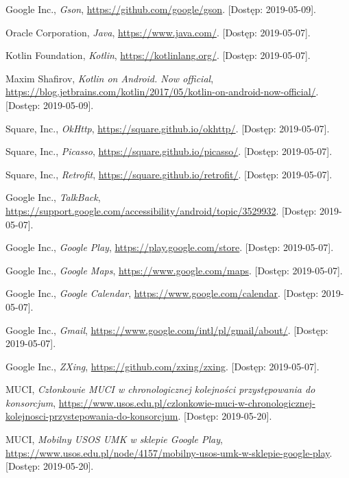 \documentclass{pracamgr}
\begin{document}
\begin{thebibliography}{99}
 Google Inc., \textit{Gson},	\url{https://github.com/google/gson}. [Dostęp: 2019-05-09].

 Oracle Corporation, \textit{Java}, \url{https://www.java.com/}. [Dostęp: 2019-05-07].

 Kotlin Foundation, \textit{Kotlin}, \url{https://kotlinlang.org/}. [Dostęp: 2019-05-07].

 Maxim Shafirov, \textit{Kotlin on Android. Now official},
	\url{https://blog.jetbrains.com/kotlin/2017/05/kotlin-on-android-now-official/}. [Dostęp: 2019-05-09].

 Square, Inc., \textit{OkHttp},	\url{https://square.github.io/okhttp/}. [Dostęp: 2019-05-07].

 Square, Inc., \textit{Picasso}, \url{https://square.github.io/picasso/}. [Dostęp: 2019-05-07].

 Square, Inc., \textit{Retrofit}, \url{https://square.github.io/retrofit/}. [Dostęp: 2019-05-07].

 Google Inc., \textit{TalkBack}, \url{https://support.google.com/accessibility/android/topic/3529932}. [Dostęp: 2019-05-07].

 Google Inc., \textit{Google Play}, \url{https://play.google.com/store}. [Dostęp: 2019-05-07].

 Google Inc., \textit{Google Maps},	\url{https://www.google.com/maps}. [Dostęp: 2019-05-07].

 Google Inc., \textit{Google Calendar},	\url{https://www.google.com/calendar}. [Dostęp: 2019-05-07].

 Google Inc., \textit{Gmail}, \url{https://www.google.com/intl/pl/gmail/about/}. [Dostęp: 2019-05-07].

 Google Inc., \textit{ZXing}, \url{https://github.com/zxing/zxing}. [Dostęp: 2019-05-07].

 MUCI, \textit{Członkowie MUCI w chronologicznej kolejności przystępowania do konsorcjum}, \url{https://www.usos.edu.pl/czlonkowie-muci-w-chronologicznej-kolejnosci-przystepowania-do-konsorcjum}. [Dostęp: 2019-05-20].

 MUCI, \textit{Mobilny USOS UMK w sklepie Google Play}, \url{https://www.usos.edu.pl/node/4157/mobilny-usos-umk-w-sklepie-google-play}. [Dostęp: 2019-05-20].


\end{thebibliography}
\end{document}
